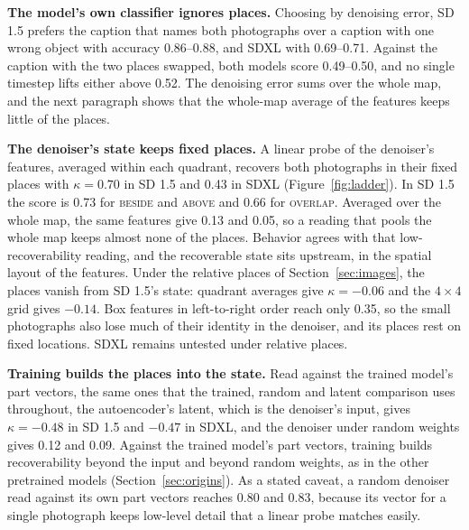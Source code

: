 \documentclass[10pt]{article}
\theoremstyle{plain}
\theoremstyle{remark}
\begin{document}
\textbf{The model's own classifier ignores places.} Choosing by denoising error, SD 1.5 prefers the caption that names both photographs over a caption with one wrong object with accuracy 0.86--0.88, and SDXL with 0.69--0.71. Against the caption with the two places swapped, both models score 0.49--0.50, and no single timestep lifts either above 0.52. The denoising error sums over the whole map, and the next paragraph shows that the whole-map average of the features keeps little of the places.

\textbf{The denoiser's state keeps fixed places.} A linear probe of the denoiser's features, averaged within each quadrant, recovers both photographs in their fixed places with $\kappa = 0.70$ in SD 1.5 and 0.43 in SDXL (Figure~\ref{fig:ladder}). In SD 1.5 the score is 0.73 for \textsc{beside} and \textsc{above} and 0.66 for \textsc{overlap}. Averaged over the whole map, the same features give 0.13 and 0.05, so a reading that pools the whole map keeps almost none of the places. Behavior agrees with that low-recoverability reading, and the recoverable state sits upstream, in the spatial layout of the features. Under the relative places of Section~\ref{sec:images}, the places vanish from SD 1.5's state: quadrant averages give $\kappa = -0.06$ and the $4 \times 4$ grid gives $-0.14$. Box features in left-to-right order reach only 0.35, so the small photographs also lose much of their identity in the denoiser, and its places rest on fixed locations. SDXL remains untested under relative places.

\textbf{Training builds the places into the state.} Read against the trained model's part vectors, the same ones that the trained, random and latent comparison uses throughout, the autoencoder's latent, which is the denoiser's input, gives $\kappa = -0.48$ in SD 1.5 and $-0.47$ in SDXL, and the denoiser under random weights gives 0.12 and 0.09. Against the trained model's part vectors, training builds recoverability beyond the input and beyond random weights, as in the other pretrained models (Section~\ref{sec:origins}). As a stated caveat, a random denoiser read against its own part vectors reaches 0.80 and 0.83, because its vector for a single photograph keeps low-level detail that a linear probe matches easily.
\end{document}
